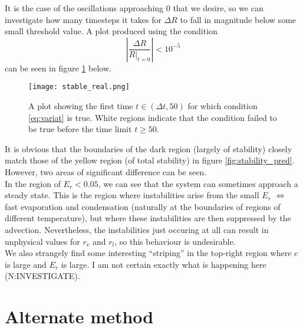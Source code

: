 \documentclass[11pt]{article}
\begin{document}
It is the case of the oscillations approaching $0$ that we desire, so we can investigate how many timesteps it takes for $\Delta R$ to fall in magnitude below some small threshold value. A plot produced using the condition
\begin{equation}
\left|\frac{\Delta R}{R|_{t=0}}\right|<10^{-5}		\label{eq:variat}
\end{equation}
can be seen in figure \ref{fig:stable_real} below.
\begin{figure}[H]
\centering
\texttt{[image: stable\_real.png]}
\caption{A plot showing the first time $t\in(\Delta t,50)$ for which condition \ref{eq:variat} is true. White regions indicate that the condition failed to be true before the time limit $t\geq 50$.}
\label{fig:stable_real}
\end{figure}
It is obvious that the boundaries of the dark region (largely of stability) closely match those of the yellow region (of total stability) in figure \ref{fig:stability_pred}. However, two areas of significant difference can be seen. \\
In the region of $E_r<0.05$, we can see that the system can sometimes approach a steady state. This is the region where instabilities arise from the small $E_r$ $\Leftrightarrow$ fast evaporation and condensation (naturally at the boundaries of regions of different temperature), but where these instabilities are then suppressed by the advection. Nevertheless, the instabilities just occuring at all can result in unphysical values for $r_v$ and $r_l$, so this behaviour is undesirable. \\
We also strangely find some interesting ``striping'' in the top-right region where $c$ is large and $E_r$ is large. I am not certain exactly what is happening here (N:INVESTIGATE). 

\section{Alternate method}

\newpage


\end{document}

